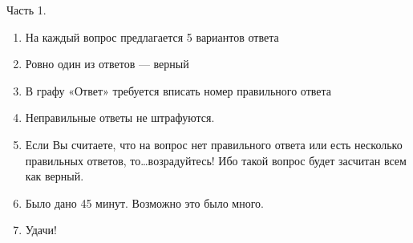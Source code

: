 \documentclass[12pt, a4paper]{article}\usepackage[]{graphicx}\usepackage[]{color}
\begin{document}
Часть 1.
\begin{enumerate}
\item На каждый вопрос предлагается 5 вариантов ответа
\item Ровно один из ответов — верный
\item В графу «Ответ» требуется вписать номер правильного ответа
\item Неправильные ответы не штрафуются.
\item Если Вы считаете, что на вопрос нет правильного ответа или есть несколько правильных ответов, то\ldots возрадуйтесь! Ибо такой вопрос будет засчитан всем как верный.
\item Было дано 45 минут. Возможно это было много.
\item Удачи!
\end{enumerate}
\end{document}
